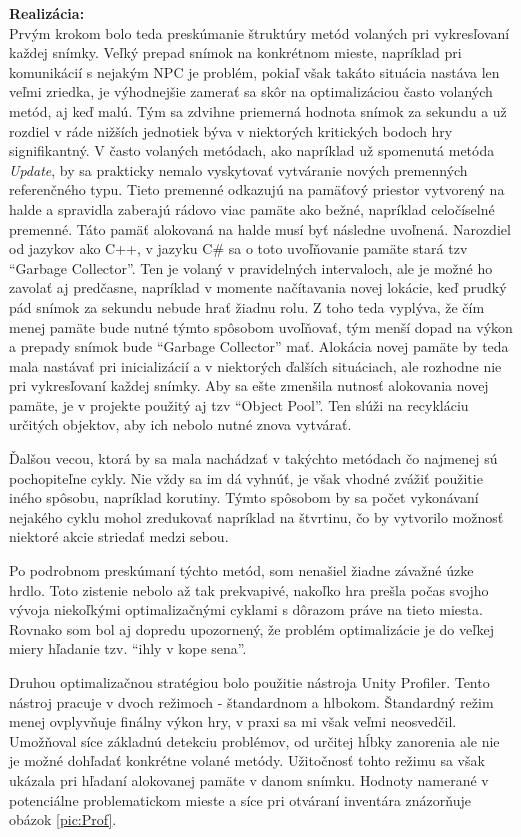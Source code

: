 \documentclass[slovak, bachelorpractice]{diploma}
\begin{document}
\textbf{Realizácia:} \\ Prvým krokom bolo teda preskúmanie štruktúry metód volaných pri vykresľovaní každej snímky. Veľký prepad snímok na konkrétnom mieste, napríklad pri komunikácií s nejakým NPC je problém, pokiaľ však takáto situácia nastáva len veľmi zriedka, je výhodnejšie zamerať sa skôr na optimalizáciou často volaných metód, aj keď malú. Tým sa zdvihne priemerná hodnota snímok za sekundu a už rozdiel v ráde nižších jednotiek býva v niektorých kritických bodoch hry signifikantný. V často volaných metódach, ako napríklad už spomenutá metóda \textit{Update}, by sa prakticky nemalo vyskytovať vytváranie nových premenných referenčného typu. Tieto premenné odkazujú na pamäťový priestor vytvorený na halde a spravidla zaberajú rádovo viac pamäte ako bežné, napríklad celočíselné premenné. Táto pamäť alokovaná na halde musí byť následne uvoľnená. Narozdiel od jazykov ako C++, v jazyku C\# sa o toto uvoľňovanie pamäte stará tzv \enquote{Garbage Collector}. Ten je volaný v pravidelných intervaloch, ale je možné ho zavolať aj predčasne, napríklad v momente načítavania novej lokácie, keď prudký pád snímok za sekundu nebude hrať žiadnu rolu. Z toho teda vyplýva, že čím menej pamäte bude nutné týmto spôsobom uvoľňovať, tým menší dopad na výkon a prepady snímok bude \enquote{Garbage Collector} mať. Alokácia novej pamäte by teda mala nastávať pri inicializácií a v niektorých ďalších situáciach, ale rozhodne nie pri vykresľovaní každej snímky. Aby sa ešte zmenšila nutnosť alokovania novej pamäte, je v projekte použitý aj tzv \enquote{Object Pool}. Ten slúži na recykláciu určitých objektov, aby ich nebolo nutné znova vytvárať. 

Ďalšou vecou, ktorá by sa mala nachádzať v takýchto metódach čo najmenej sú pochopiteľne cykly. Nie vždy sa im dá vyhnúť, je však vhodné zvážiť použitie iného spôsobu, napríklad korutiny. Týmto spôsobom by sa počet vykonávaní nejakého cyklu mohol zredukovať napríklad na štvrtinu, čo by vytvorilo možnosť niektoré akcie striedať medzi sebou.

Po podrobnom preskúmaní týchto metód, som nenašiel žiadne závažné úzke hrdlo. Toto zistenie nebolo až tak prekvapivé, nakoľko hra prešla počas svojho vývoja niekoľkými optimalizačnými cyklami s dôrazom práve na tieto miesta. Rovnako som bol aj dopredu upozornený, že problém optimalizácie je do veľkej miery hľadanie tzv. \enquote{ihly v kope sena}.

Druhou optimalizačnou stratégiou bolo použitie nástroja Unity Profiler. Tento nástroj pracuje v dvoch režimoch - štandardnom a hlbokom. Štandardný režim menej ovplyvňuje finálny výkon hry, v praxi sa mi však veľmi neosvedčil. Umožňoval síce základnú detekciu problémov, od určitej hĺbky zanorenia ale nie je možné dohľadať konkrétne volané metódy. Užitočnosť tohto režimu sa však ukázala pri hľadaní alokovanej pamäte v danom snímku. Hodnoty namerané v potenciálne problematickom mieste a síce pri otváraní inventára znázorňuje obázok \ref{pic:Prof}.
\end{document}
